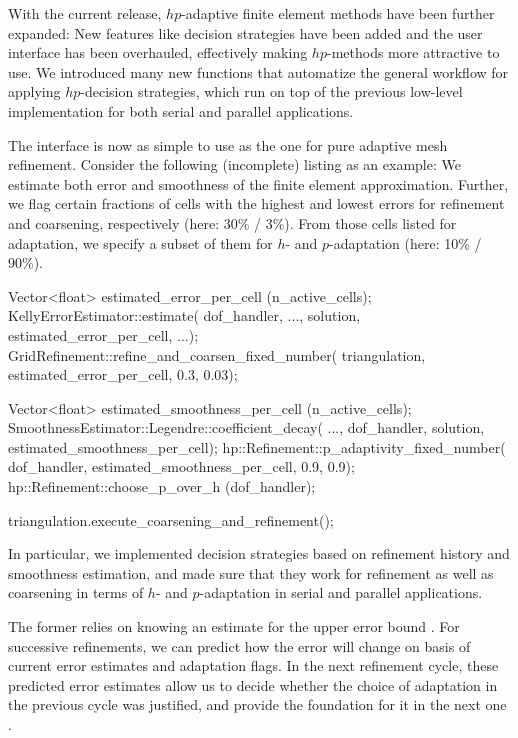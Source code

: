 \documentclass{ansarticle-preprint}
\begin{document}
With the current release, $hp$-adaptive finite element methods have been further
expanded: New features like decision strategies have been added and the user interface
has been overhauled, effectively making $hp$-methods more attractive to use. We introduced
many new functions that automatize the general workflow for applying $hp$-decision
strategies, which run on top of the previous low-level implementation for both serial
and parallel applications.

The interface is now as simple to use as the one for pure adaptive mesh refinement.
Consider the following (incomplete) listing as an example: We estimate both error and
smoothness of the finite element approximation. Further, we flag certain fractions of
cells with the highest and lowest errors for refinement and coarsening, respectively
(here: 30\% / 3\%). From those cells listed for adaptation, we specify a subset of them
for $h$- and $p$-adaptation (here: 10\% / 90\%).
\begin{c++}
Vector<float> estimated_error_per_cell (n_active_cells);
KellyErrorEstimator::estimate(
  dof_handler, ..., solution, estimated_error_per_cell, ...);
GridRefinement::refine_and_coarsen_fixed_number(
  triangulation, estimated_error_per_cell, 0.3, 0.03);

Vector<float> estimated_smoothness_per_cell (n_active_cells);
SmoothnessEstimator::Legendre::coefficient_decay(
  ..., dof_handler, solution, estimated_smoothness_per_cell);
hp::Refinement::p_adaptivity_fixed_number(
  dof_handler, estimated_smoothness_per_cell, 0.9, 0.9);
hp::Refinement::choose_p_over_h (dof_handler);

triangulation.execute_coarsening_and_refinement();
\end{c++}

In particular, we implemented decision strategies based on refinement history and
smoothness estimation, and made sure that they work for refinement as well as
coarsening in terms of $h$- and $p$-adaptation in serial and parallel applications.

The former relies on knowing an estimate for the upper error bound \cite[Thm.~3.4]{BabuskaSuri1990}.
For successive refinements, we can predict how the error will change on basis of
current error estimates and adaptation flags. In the next refinement cycle, these
predicted error estimates allow us to decide whether the choice of adaptation in
the previous cycle was justified, and provide the foundation for it in the next
one \cite{MelenkWohlmuth2001}.
\end{document}
